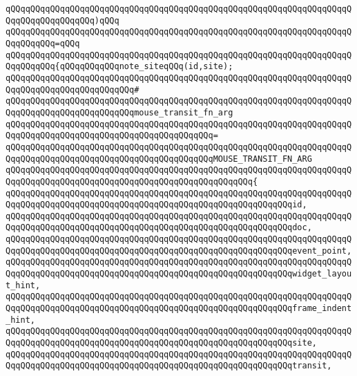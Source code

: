 \verb|qQQqqQQqqQQqqQQqqQQqqQQqqQQqqQQqqQQqqQQqqQQqqQQqqQQqqQQqqQQqqQQqqQQqqQQqqQQqqQQqqQQqqQQq)qQQq|\newline
\verb|qQQqqQQqqQQqqQQqqQQqqQQqqQQqqQQqqQQqqQQqqQQqqQQqqQQqqQQqqQQqqQQqqQQqqQQqqQQqqQQq=qQQq|\newline
\verb|qQQqqQQqqQQqqQQqqQQqqQQqqQQqqQQqqQQqqQQqqQQqqQQqqQQqqQQqqQQqqQQqqQQqqQQqqQQqqQQq{qQQqqQQqqQQqnote_siteqQQq(id,site);|\newline
\verb|qQQqqQQqqQQqqQQqqQQqqQQqqQQqqQQqqQQqqQQqqQQqqQQqqQQqqQQqqQQqqQQqqQQqqQQqqQQqqQQqqQQqqQQqqQQqqQQq#|\newline
\verb|qQQqqQQqqQQqqQQqqQQqqQQqqQQqqQQqqQQqqQQqqQQqqQQqqQQqqQQqqQQqqQQqqQQqqQQqqQQqqQQqqQQqqQQqqQQqqQQqmouse_transit_fn_arg|\newline
\verb|qQQqqQQqqQQqqQQqqQQqqQQqqQQqqQQqqQQqqQQqqQQqqQQqqQQqqQQqqQQqqQQqqQQqqQQqqQQqqQQqqQQqqQQqqQQqqQQqqQQqqQQqqQQqqQQq=|\newline
\verb|qQQqqQQqqQQqqQQqqQQqqQQqqQQqqQQqqQQqqQQqqQQqqQQqqQQqqQQqqQQqqQQqqQQqqQQqqQQqqQQqqQQqqQQqqQQqqQQqqQQqqQQqqQQqqQQqMOUSE_TRANSIT_FN_ARG|\newline
\verb|qQQqqQQqqQQqqQQqqQQqqQQqqQQqqQQqqQQqqQQqqQQqqQQqqQQqqQQqqQQqqQQqqQQqqQQqqQQqqQQqqQQqqQQqqQQqqQQqqQQqqQQqqQQqqQQqqQQqqQQq{|\newline
\verb|qQQqqQQqqQQqqQQqqQQqqQQqqQQqqQQqqQQqqQQqqQQqqQQqqQQqqQQqqQQqqQQqqQQqqQQqqQQqqQQqqQQqqQQqqQQqqQQqqQQqqQQqqQQqqQQqqQQqqQQqqQQqqQQqid,|\newline
\verb|qQQqqQQqqQQqqQQqqQQqqQQqqQQqqQQqqQQqqQQqqQQqqQQqqQQqqQQqqQQqqQQqqQQqqQQqqQQqqQQqqQQqqQQqqQQqqQQqqQQqqQQqqQQqqQQqqQQqqQQqqQQqqQQqdoc,|\newline
\verb|qQQqqQQqqQQqqQQqqQQqqQQqqQQqqQQqqQQqqQQqqQQqqQQqqQQqqQQqqQQqqQQqqQQqqQQqqQQqqQQqqQQqqQQqqQQqqQQqqQQqqQQqqQQqqQQqqQQqqQQqqQQqqQQqevent_point,|\newline
\verb|qQQqqQQqqQQqqQQqqQQqqQQqqQQqqQQqqQQqqQQqqQQqqQQqqQQqqQQqqQQqqQQqqQQqqQQqqQQqqQQqqQQqqQQqqQQqqQQqqQQqqQQqqQQqqQQqqQQqqQQqqQQqqQQqwidget_layout_hint,|\newline
\verb|qQQqqQQqqQQqqQQqqQQqqQQqqQQqqQQqqQQqqQQqqQQqqQQqqQQqqQQqqQQqqQQqqQQqqQQqqQQqqQQqqQQqqQQqqQQqqQQqqQQqqQQqqQQqqQQqqQQqqQQqqQQqqQQqframe_indent_hint,|\newline
\verb|qQQqqQQqqQQqqQQqqQQqqQQqqQQqqQQqqQQqqQQqqQQqqQQqqQQqqQQqqQQqqQQqqQQqqQQqqQQqqQQqqQQqqQQqqQQqqQQqqQQqqQQqqQQqqQQqqQQqqQQqqQQqqQQqsite,|\newline
\verb|qQQqqQQqqQQqqQQqqQQqqQQqqQQqqQQqqQQqqQQqqQQqqQQqqQQqqQQqqQQqqQQqqQQqqQQqqQQqqQQqqQQqqQQqqQQqqQQqqQQqqQQqqQQqqQQqqQQqqQQqqQQqqQQqtransit,|\newline
